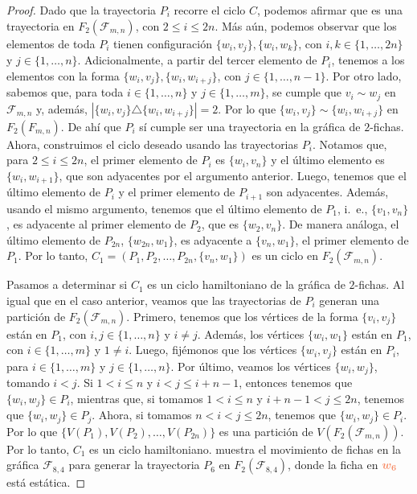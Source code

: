 \begin{proof}
    Dado que la trayectoria $P_i$ recorre el ciclo $C$, podemos afirmar que es
    una trayectoria en $F_2(\mathcal{F}_{m,n})$, con $2\leq i \leq 2n$. M\'as
    a\'un, podemos observar que los elementos de toda $P_i$ tienen
    configuraci\'on $\{w_i,v_j\},\{w_i,w_k\}$, con $i, k\in \{1, \dots, 2n\}$ y
    $j \in \{1, \dots, n\}$. Adicionalmente, a partir del tercer elemento de
    $P_i$, tenemos a los elementos con la forma $\{w_i,v_j\},\{w_i,w_{i+j}\}$,
    con $j \in \{1, \dots, n-1\}$.  Por otro lado, sabemos que, para toda $i \in
    \{1, \dots, n\}$ y $j \in \{1, \dots, m\}$, se cumple que $v_i \sim w_j$ en
    $\mathcal{F}_{m,n}$ y, adem\'as, $|\{w_i,v_j\} \triangle \{w_i,
    w_{i+j}\}|=2$. Por lo que $\{w_i,v_j\} \sim \{w_i, w_{i+j}\}$ en
    $F_2(F_{m,n})$. De ah\'i que $P_i$ s\'i cumple ser una trayectoria en la
    gr\'afica de $2$-fichas. Ahora, construimos el ciclo deseado usando las
    trayectorias $P_i$. Notamos que, para $2 \leq i \leq 2n$, el primer elemento
    de $P_i$ es $\{w_i, v_n\}$ y el \'ultimo elemento es $\{w_i, w_{i+1}\}$, que
    son adyacentes por el argumento anterior. Luego, tenemos que el \'ultimo
    elemento de $P_i$ y el primer elemento de $P_{i+1}$ son adyacentes.
    Adem\'as, usando el mismo argumento, tenemos que el \'ultimo elemento de
    $P_1$, i.~e., $\{v_1,v_n\}$, es adyacente al primer elemento de $P_2$, que
    es $\{w_2,v_n\}$. De manera an\'aloga, el \'ultimo elemento de $P_{2n}$,
    $\{w_{2n},w_1\}$, es adyacente a $\{v_n,w_1\}$, el primer elemento de $P_1$.
    Por lo tanto, $C_1 = (P_1,P_2, \dots, P_{2n},\{v_n,w_1\})$ es un ciclo en
    $F_2(\mathcal{F}_{m,n})$. 

    Pasamos a determinar si $C_1$ es un ciclo hamiltoniano de la gr\'afica de
    $2$-fichas. Al igual que en el caso anterior, veamos que las trayectorias de
    $P_i$ generan una partici\'on de $F_2(\mathcal{F}_{m,n})$. Primero, tenemos
    que los v\'ertices de la forma $\{v_i,v_j\}$ est\'an en $P_1$, con $i,j \in
    \{1, \dots, n\}$ y $i \neq j$. Adem\'as, los v\'ertices $\{w_i,w_1\}$
    est\'an en $P_1$, con $i \in \{1, \dots, m\}$ y $1 \neq i$. Luego,
    fij\'emonos que los v\'ertices $\{w_i,v_j\}$ est\'an en $P_i$, para $i\in
    \{1, \dots, m\}$ y $j \in \{1, \dots, n\}$. Por \'ultimo, veamos los
    v\'ertices $\{w_i,w_j\}$, tomando $i < j$. Si $1 < i \leq n$ y $i < j \leq
    i+n-1$, entonces tenemos que $\{w_i,w_j\} \in P_i$, mientras que, si tomamos
    $1 < i \leq n$ y $i+n-1 < j \leq 2n$, tenemos que $\{w_i,w_j\} \in P_j$.
    Ahora, si tomamos $n<i<j \leq 2n$, tenemos que $\{w_i,w_j\} \in P_i$. Por lo
    que $\{V(P_1),V(P_2), \dots, V(P_{2n})\}$ es una partici\'on de
    $V(F_2(\mathcal{F}_{m,n}))$. Por lo tanto, $C_1$ es un ciclo hamiltoniano.
     muestra el movimiento de fichas en la gr\'afica
    $\mathcal{F}_{8,4}$ para generar la trayectoria $P_6$ en
    $F_2(\mathcal{F}_{8,4})$, donde la ficha en ${\color{coral}\boldsymbol
    {w_6}}$ est\'a
    est\'atica.



\end{proof}
